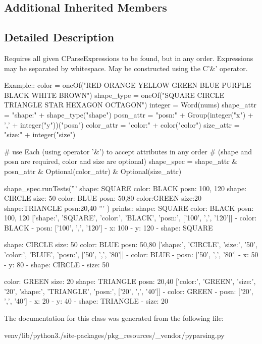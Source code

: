 \subsection*{Additional Inherited Members}


\subsection{Detailed Description}
\begin{DoxyVerb}Requires all given C{ParseExpression}s to be found, but in any order.
Expressions may be separated by whitespace.
May be constructed using the C{'&'} operator.

Example::
    color = oneOf("RED ORANGE YELLOW GREEN BLUE PURPLE BLACK WHITE BROWN")
    shape_type = oneOf("SQUARE CIRCLE TRIANGLE STAR HEXAGON OCTAGON")
    integer = Word(nums)
    shape_attr = "shape:" + shape_type("shape")
    posn_attr = "posn:" + Group(integer("x") + ',' + integer("y"))("posn")
    color_attr = "color:" + color("color")
    size_attr = "size:" + integer("size")

    # use Each (using operator '&') to accept attributes in any order 
    # (shape and posn are required, color and size are optional)
    shape_spec = shape_attr & posn_attr & Optional(color_attr) & Optional(size_attr)

    shape_spec.runTests('''
        shape: SQUARE color: BLACK posn: 100, 120
        shape: CIRCLE size: 50 color: BLUE posn: 50,80
        color:GREEN size:20 shape:TRIANGLE posn:20,40
        '''
        )
prints::
    shape: SQUARE color: BLACK posn: 100, 120
    ['shape:', 'SQUARE', 'color:', 'BLACK', 'posn:', ['100', ',', '120']]
    - color: BLACK
    - posn: ['100', ',', '120']
      - x: 100
      - y: 120
    - shape: SQUARE


    shape: CIRCLE size: 50 color: BLUE posn: 50,80
    ['shape:', 'CIRCLE', 'size:', '50', 'color:', 'BLUE', 'posn:', ['50', ',', '80']]
    - color: BLUE
    - posn: ['50', ',', '80']
      - x: 50
      - y: 80
    - shape: CIRCLE
    - size: 50


    color: GREEN size: 20 shape: TRIANGLE posn: 20,40
    ['color:', 'GREEN', 'size:', '20', 'shape:', 'TRIANGLE', 'posn:', ['20', ',', '40']]
    - color: GREEN
    - posn: ['20', ',', '40']
      - x: 20
      - y: 40
    - shape: TRIANGLE
    - size: 20
\end{DoxyVerb}
 

The documentation for this class was generated from the following file\+:\begin{DoxyCompactItemize}
\item 
venv/lib/python3./site-\/packages/pkg\+\_\+resources/\+\_\+vendor/pyparsing.\+py\end{DoxyCompactItemize}
